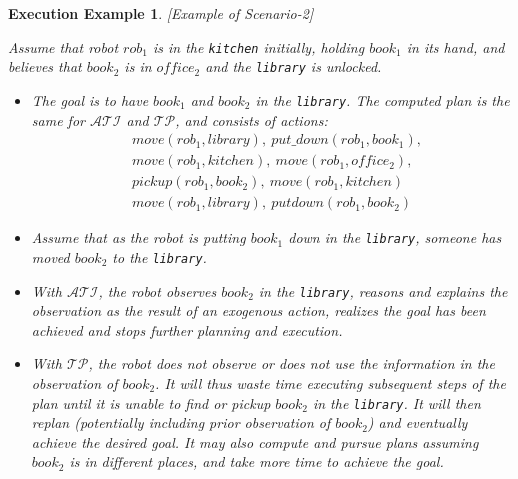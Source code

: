 \documentclass[letterpaper, 10 pt, conference]{ieeeconf}  %
\newcommand{\stt}[1]{{\small\texttt{#1}}}
\newtheorem{execexample}{\bf Execution Example}
\begin{document}
\begin{execexample}\label{exec:example1}[Example of Scenario-2]\\
  {\rm Assume that robot $rob_1$ is in the \stt{kitchen} initially,
    holding $book_1$ in its hand, and believes that $book_2$ is in
    $office_2$ and the \stt{library} is unlocked.
    \begin{itemize}
    \item The goal is to have $book_1$ and $book_2$ in the
      \stt{library}.  The computed plan is the same for
      $\mathcal{ATI}$ and $\mathcal{TP}$, and consists of actions:
      \begin{align*}
        &move(rob_1, library),~put\_down(rob_1, book_1),\\
        &move(rob_1, kitchen), ~move(rob_1, office_2),\\
        &pickup(rob_1, book_2), ~move(rob_1, kitchen)\\
        &move(rob_1, library), ~putdown(rob_1, book_2)
      \end{align*}
      
    \item Assume that as the robot is putting $book_1$ down in the
      \stt{library}, someone has moved $book_2$ to the \stt{library}.

    \item With $\mathcal{ATI}$, the robot observes $book_2$ in the
      \stt{library}, reasons and explains the observation as the
      result of an exogenous action, realizes the goal has been
      achieved and stops further planning and execution.

    \item With $\mathcal{TP}$, the robot does not observe or does not
      use the information in the observation of $book_2$. It will thus
      waste time executing subsequent steps of the plan until it is
      unable to find or pickup $book_2$ in the \stt{library}. It will
      then replan (potentially including prior observation of
      $book_2$) and eventually achieve the desired goal. It may also
      compute and pursue plans assuming $book_2$ is in different
      places, and take more time to achieve the goal.
    \end{itemize}
  }
\end{execexample}
\end{document}
